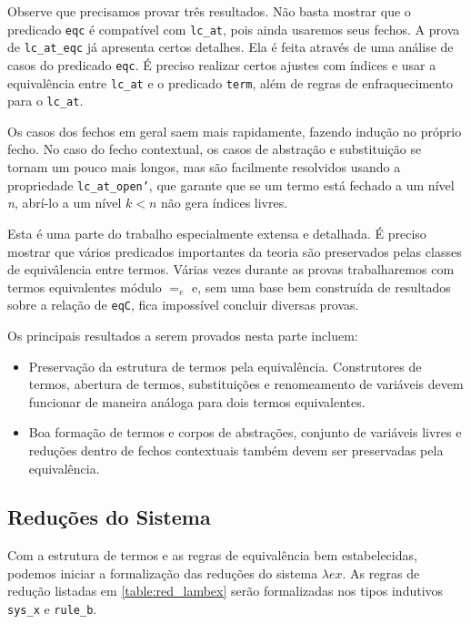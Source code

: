 \bigskip

Observe que precisamos provar três resultados. Não basta mostrar que o predicado
\texttt{eqc} é compatível com \texttt{lc\_at}, pois ainda usaremos seus fechos.
A prova de \texttt{lc\_at\_eqc} já apresenta certos detalhes. Ela é feita
através de uma análise de casos do predicado \texttt{eqc}. É preciso realizar
certos ajustes com índices e usar a equivalência entre \texttt{lc\_at} e o
predicado \texttt{term}, além de regras de enfraquecimento para o \texttt{lc\_at}.

Os casos dos fechos em geral saem mais rapidamente, fazendo indução no próprio
fecho. No caso do fecho contextual, os casos de abstração e substituição se
tornam um pouco mais longos, mas são facilmente resolvidos usando a propriedade
\texttt{lc\_at\_open'}, que garante que se um termo está fechado a um nível
\emph{n}, abrí-lo a um nível $k < n$ não gera índices livres.

Esta é uma parte do trabalho especialmente extensa e detalhada. É preciso
mostrar que vários predicados importantes da teoria são preservados pelas
classes de equivâlencia entre termos. Várias vezes durante as provas
trabalharemos com termos equivalentes módulo $=_e$ e, sem uma base bem
construída de resultados sobre a relação de \texttt{eqC}, fica impossível
concluir diversas provas.

Os principais resultados a serem provados nesta parte incluem:

\begin{itemize}
    \item Preservação da estrutura de termos pela equivalência. Construtores de
        termos, abertura de termos, substituições e renomeamento de variáveis
        devem funcionar de maneira análoga para dois termos equivalentes.
    \item Boa formação de termos e corpos de abstrações, conjunto de variáveis
        livres e reduções dentro de fechos contextuais também devem ser
        preservadas pela equivalência.
\end{itemize}

\subsection{Reduções do Sistema}
\label{sub:redu_es_do_sistema}

Com a estrutura de termos e as regras de equivalência bem estabelecidas, podemos
iniciar a formalização das reduções do sistema $\lambda ex$.
As regras de redução listadas em  \ref{table:red_lambex} serão formalizadas nos
tipos indutivos \texttt{sys\_x} e \texttt{rule\_b}.

